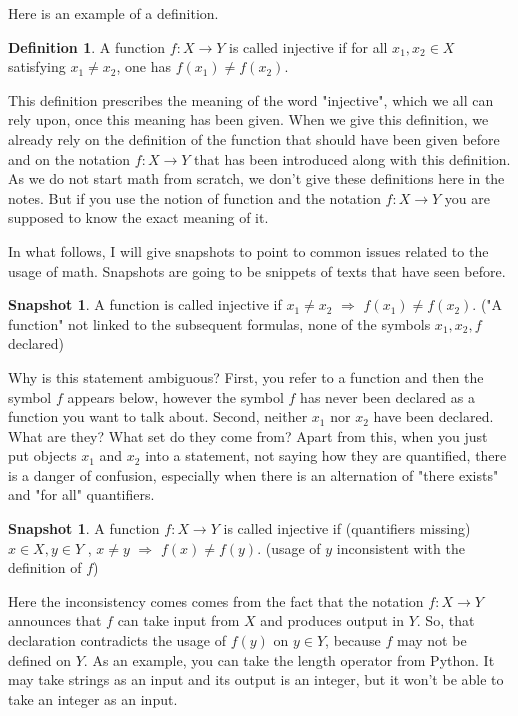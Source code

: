 \documentclass[11pt]{article}
\theoremstyle{plain}
\theoremstyle{definition}
\newtheorem{defn}[theorem]{Definition}
\newtheorem{snapshot}[theorem]{Snapshot}
\begin{document}
Here is an example of a definition. 

\begin{defn} 
	A function $f: X \to Y$ is called injective if for all $x_1,x_2 \in X$ satisfying $x_1 \ne x_2$, one has $f(x_1) \ne f(x_2)$. 
\end{defn} 

This definition prescribes the meaning of the word "injective", which we all can rely upon, once this meaning has been given. When we give this definition, we already rely on the definition of the function that should have been given before and on the notation $f: X \to Y$ that has been introduced along with this definition. As we do not start math from scratch, we don't give these definitions here in the notes. But if you use the notion of function and the notation $f: X \to Y$ you are supposed to know the exact meaning of it. 

In what follows, I will give snapshots to point to common issues related to the usage of math. Snapshots are going to be snippets of texts that have seen before. 


\begin{snapshot} 
	{ \color{blue} A function is called injective if $x_1 \ne x_2$ $\Rightarrow$ $f(x_1) \ne f(x_2)$. {\color{red} ("A function" not linked to the subsequent formulas, none of the symbols $x_1,x_2, f$ declared)}}
	
	Why is this statement ambiguous? First, you refer to a function and then the symbol $f$ appears below, however the symbol $f$ has never been declared as a function you want to talk about. Second, neither $x_1$ nor $x_2$ have been declared. What are they? What set do they come from? Apart from this, when you just put objects $x_1$ and $x_2$ into a statement, not saying how they are quantified, there is a danger of confusion, especially when there is an alternation of "there exists" and "for all" quantifiers. 

\end{snapshot} 

\begin{snapshot} 
	{ \color{blue} A function $f: X \to Y$ is called injective if {\color{red} (quantifiers missing)} $x \in X, y \in Y$ , $x \ne y$ $\Rightarrow$ $f(x) \ne f(y)$. {\color{red} (usage of $y$ inconsistent with the definition of $f$) }}
	
	Here the inconsistency comes comes from the fact that the notation $f: X \to Y$ announces that $f$ can take input from $X$ and produces output in $Y$. So, that declaration contradicts the usage of $f(y)$ on $y \in Y$, because $f$ may not be defined on $Y$. As an example, you can take the length operator from Python. It may take strings as an input and its output is an integer, but it won't be able to take an integer as an input. 
\end{snapshot} 
\end{document}
